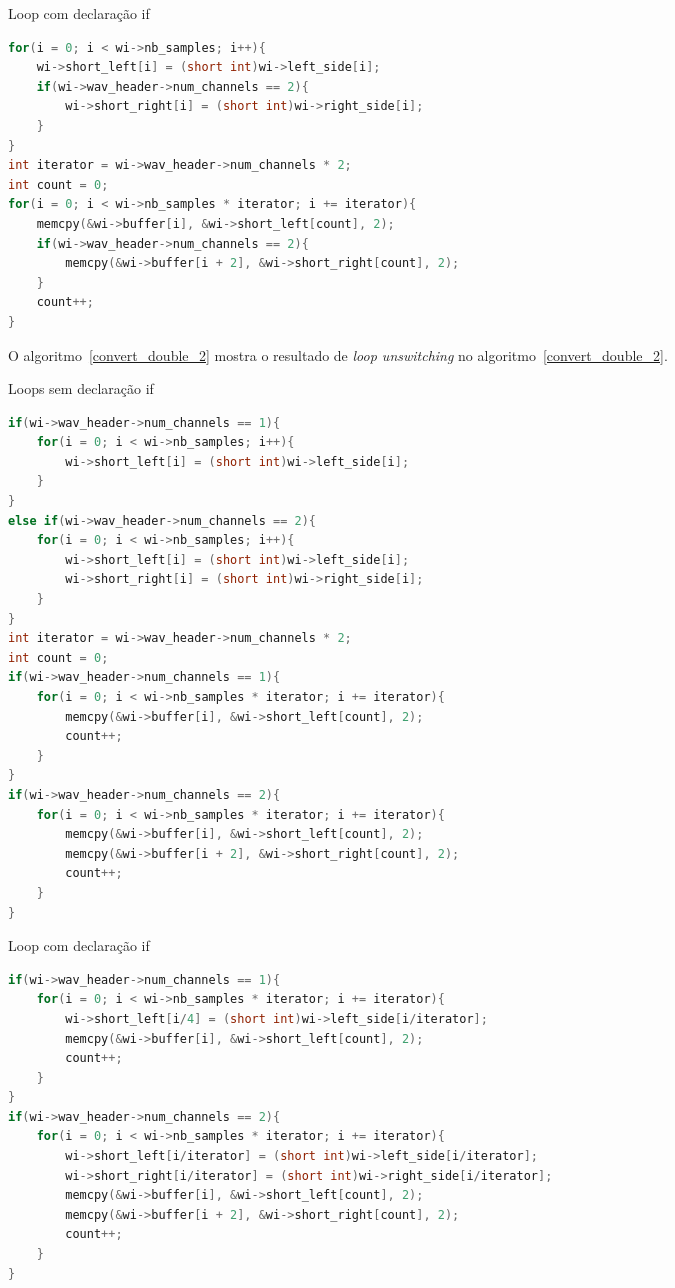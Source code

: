 \begin{algorithm}
\caption{Loop com declaração if }
\label{convert_double_1}
\begin{lstlisting}[language=c]
for(i = 0; i < wi->nb_samples; i++){
    wi->short_left[i] = (short int)wi->left_side[i];
    if(wi->wav_header->num_channels == 2){
        wi->short_right[i] = (short int)wi->right_side[i];
    }
}
int iterator = wi->wav_header->num_channels * 2;
int count = 0;
for(i = 0; i < wi->nb_samples * iterator; i += iterator){
    memcpy(&wi->buffer[i], &wi->short_left[count], 2);
    if(wi->wav_header->num_channels == 2){
        memcpy(&wi->buffer[i + 2], &wi->short_right[count], 2);
    }
    count++;
}
\end{lstlisting}
\end{algorithm}

O algoritmo~\ref{convert_double_2} mostra o resultado de \textit{loop
unswitching} no algoritmo~\ref{convert_double_2}.

\begin{algorithm}
\caption{Loops sem declaração if}
\label{convert_double_2}
\begin{lstlisting}[language=c]
if(wi->wav_header->num_channels == 1){
    for(i = 0; i < wi->nb_samples; i++){
        wi->short_left[i] = (short int)wi->left_side[i];
    }
}
else if(wi->wav_header->num_channels == 2){
    for(i = 0; i < wi->nb_samples; i++){
        wi->short_left[i] = (short int)wi->left_side[i];
        wi->short_right[i] = (short int)wi->right_side[i];
    }
}
int iterator = wi->wav_header->num_channels * 2;
int count = 0;
if(wi->wav_header->num_channels == 1){
    for(i = 0; i < wi->nb_samples * iterator; i += iterator){
        memcpy(&wi->buffer[i], &wi->short_left[count], 2);
        count++;
    }
}
if(wi->wav_header->num_channels == 2){
    for(i = 0; i < wi->nb_samples * iterator; i += iterator){
        memcpy(&wi->buffer[i], &wi->short_left[count], 2);
        memcpy(&wi->buffer[i + 2], &wi->short_right[count], 2);
        count++;
    }
}
\end{lstlisting}
\end{algorithm}

\begin{algorithm}
\caption{Loop com declaração if }
\label{convert_double_3}
\begin{lstlisting}[language=c]
if(wi->wav_header->num_channels == 1){
    for(i = 0; i < wi->nb_samples * iterator; i += iterator){
        wi->short_left[i/4] = (short int)wi->left_side[i/iterator];
        memcpy(&wi->buffer[i], &wi->short_left[count], 2);
        count++;
    }
}
if(wi->wav_header->num_channels == 2){
    for(i = 0; i < wi->nb_samples * iterator; i += iterator){
        wi->short_left[i/iterator] = (short int)wi->left_side[i/iterator];
        wi->short_right[i/iterator] = (short int)wi->right_side[i/iterator];
        memcpy(&wi->buffer[i], &wi->short_left[count], 2);
        memcpy(&wi->buffer[i + 2], &wi->short_right[count], 2);
        count++;
    }
}
\end{lstlisting}
\end{algorithm}



